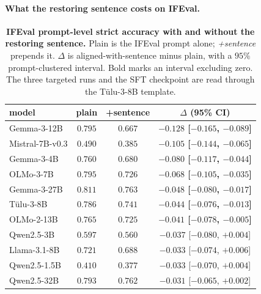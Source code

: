 \paragraph*{What the restoring sentence costs on IFEval.}
\begin{table}[t]\centering\small
\caption{\textbf{IFEval prompt-level strict accuracy with and without the restoring sentence.} Plain is the IFEval prompt alone; \emph{+sentence} prepends it. $\Delta$ is aligned-with-sentence minus plain, with a $95\%$ prompt-clustered interval. Bold marks an interval excluding zero. The three targeted runs and the SFT checkpoint are read through the T\"ulu-3-8B template.}
\label{tab:ifeval}
\begin{tabular}{@{}lccc@{}}
\toprule
model & plain & +sentence & $\Delta$ (95\% CI) \\
\midrule
Gemma-3-12B & $0.795$ & $0.667$ & \textbf{$-0.128$ [$-0.165$, $-0.089$]} \\
Mistral-7B-v0.3 & $0.490$ & $0.385$ & \textbf{$-0.105$ [$-0.144$, $-0.065$]} \\
Gemma-3-4B & $0.760$ & $0.680$ & \textbf{$-0.080$ [$-0.117$, $-0.044$]} \\
OLMo-3-7B & $0.795$ & $0.726$ & \textbf{$-0.068$ [$-0.105$, $-0.035$]} \\
Gemma-3-27B & $0.811$ & $0.763$ & \textbf{$-0.048$ [$-0.080$, $-0.017$]} \\
T\"ulu-3-8B & $0.786$ & $0.741$ & \textbf{$-0.044$ [$-0.076$, $-0.013$]} \\
OLMo-2-13B & $0.765$ & $0.725$ & \textbf{$-0.041$ [$-0.078$, $-0.005$]} \\
Qwen2.5-3B & $0.597$ & $0.560$ & $-0.037$ [$-0.080$, $+0.004$] \\
Llama-3.1-8B & $0.721$ & $0.688$ & $-0.033$ [$-0.074$, $+0.006$] \\
Qwen2.5-1.5B & $0.410$ & $0.377$ & $-0.033$ [$-0.070$, $+0.004$] \\
Qwen2.5-32B & $0.793$ & $0.762$ & $-0.031$ [$-0.065$, $+0.002$] \\

\end{tabular}
\end{table}
